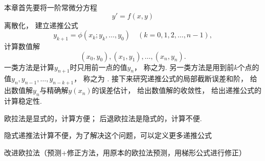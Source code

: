 本章首先要将一阶常微分方程\begin{equation*}
	y' = f(x,y)
\end{equation*}
离散化，
建立递推公式\begin{equation*}
	y_{k+1} = \phi(x_k;y_k,\dotsc,y_0)
	\quad(k=0,1,2,\dotsc,n-1),
\end{equation*}
计算数值解\begin{equation*}
	(x_0,y_0),
	(x_1,y_1),
	\dotsc,
	(x_n,y_n).
\end{equation*}
一类方法是计算\(y_{n+1}\)时只用前一点的值\(y_n\)，
称之为.
另一类方法是用到前\(k\)个点的值\(y_n,y_{n-1},\dotsc,y_{n-k+1}\)，
称之为 .
接下来研究递推公式的局部截断误差和阶，
给出数值解\(y_n\)与精确解\(y(x_n)\)的误差估计，
给出数值解的收敛性，
给出递推公式的计算稳定性.

欧拉法是显式的，计算方便；
后退欧拉法是隐式的，计算不便.

隐式递推法计算不便，为了解决这个问题，可以定义更多递推公式

改进欧拉法（预测+修正方法，用原本的欧拉法预测，用梯形公式进行修正）
